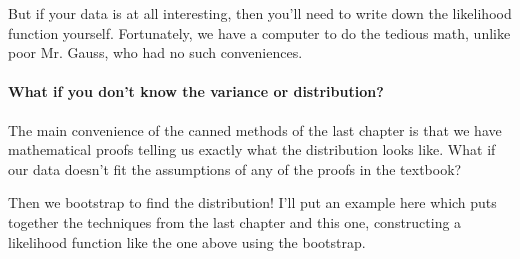 But if your data is at all interesting, then you'll need to write down
the likelihood function yourself.  Fortunately, we have a computer to
do the tedious math, unlike poor Mr. Gauss, who had no such conveniences.


\paragraph{What if you don't know the variance or distribution?} The main convenience of the canned methods of the last
chapter is that we have mathematical proofs telling us exactly what the distribution looks like. What if
our data doesn't fit the assumptions of any of the proofs in the textbook?

Then we bootstrap to find the distribution! I'll put an example here which puts together the techniques
from the last chapter and this one, constructing a likelihood function like the one above using the
bootstrap.

